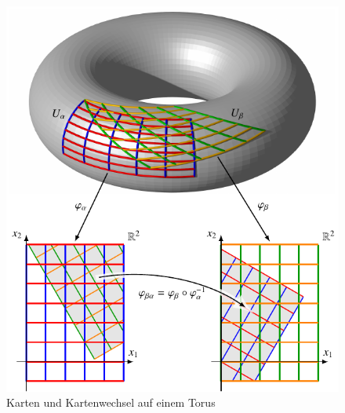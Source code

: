 %
%
%
\begin{figure}
\centering
\includegraphics{chapters/020-koordinaten/images/karten.pdf}
\caption{Karten und Kartenwechsel auf einem Torus
\label{buch:koordinaten:fig:toruskarten}}
\end{figure}
